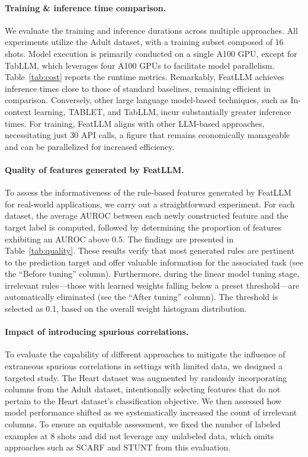 \vspace*{-0.12in}
\paragraph{Training \& inference time comparison.} We evaluate the training and inference durations across multiple approaches. All experiments utilize the Adult dataset, with a training subset composed of 16 shots. Model execution is primarily conducted on a single A100 GPU, except for TabLLM, which leverages four A100 GPUs to facilitate model parallelism. Table~\ref{tab:cost} reports the runtime metrics. Remarkably, \textsf{FeatLLM} achieves inference times close to those of standard baselines, remaining efficient in comparison. Conversely, other large language model-based techniques, such as In-context learning, TABLET, and TabLLM, incur substantially greater inference times. For training, \textsf{FeatLLM} aligns with other LLM-based approaches, necessitating just 30 API calls, a figure that remains economically manageable and can be parallelized for increased efficiency.

\vspace*{-0.12in}
\paragraph{Quality of features generated by \textsf{FeatLLM}.}
To assess the informativeness of the rule-based features generated by \textsf{FeatLLM} for real-world applications, we carry out a straightforward experiment. For each dataset, the average AUROC between each newly constructed feature and the target label is computed, followed by determining the proportion of features exhibiting an AUROC above 0.5. The findings are presented in Table~\ref{tab:quality}. These results verify that most generated rules are pertinent to the prediction target and offer valuable information for the associated task (see the ``Before tuning'' column). Furthermore, during the linear model tuning stage, irrelevant rules—those with learned weights falling below a preset threshold—are automatically eliminated (see the ``After tuning'' column). The threshold is selected as 0.1, based on the overall weight histogram distribution.

\vspace*{-0.12in}
\paragraph{Impact of introducing spurious correlations.} To evaluate the capability of different approaches to mitigate the influence of extraneous spurious correlations in settings with limited data, we designed a targeted study. The Heart dataset was augmented by randomly incorporating columns from the Adult dataset, intentionally selecting features that do not pertain to the Heart dataset's classification objective. We then assessed how model performance shifted as we systematically increased the count of irrelevant columns. To ensure an equitable assessment, we fixed the number of labeled examples at 8 shots and did not leverage any unlabeled data, which omits approaches such as SCARF and STUNT from this evaluation.

